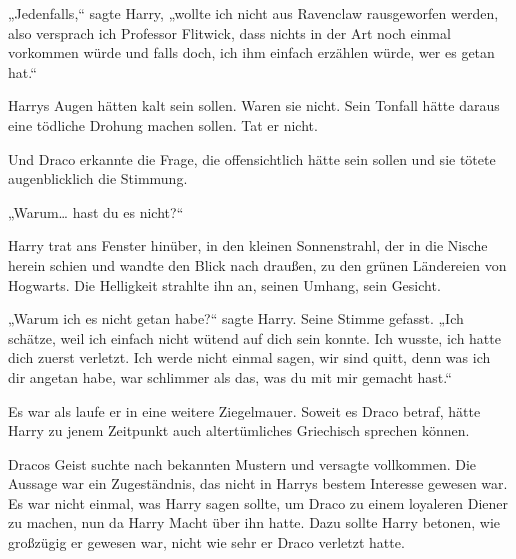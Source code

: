 „Jedenfalls,“ sagte Harry, „wollte ich nicht aus Ravenclaw rausgeworfen werden, also versprach ich Professor Flitwick, dass nichts in der Art noch einmal vorkommen würde und falls doch, ich ihm einfach erzählen würde, wer es getan hat.“

Harrys Augen hätten kalt sein sollen. Waren sie nicht. Sein Tonfall hätte daraus eine tödliche Drohung machen sollen. Tat er nicht.

Und Draco erkannte die Frage, die offensichtlich hätte sein sollen und sie tötete augenblicklich die Stimmung.

„Warum… hast du es nicht?“

Harry trat ans Fenster hinüber, in den kleinen Sonnenstrahl, der in die Nische herein schien und wandte den Blick nach draußen, zu den grünen Ländereien von Hogwarts. Die Helligkeit strahlte ihn an, seinen Umhang, sein Gesicht.

„Warum ich es nicht getan habe?“ sagte Harry. Seine Stimme gefasst. „Ich schätze, weil ich einfach nicht wütend auf dich sein konnte. Ich wusste, ich hatte dich zuerst verletzt. Ich werde nicht einmal sagen, wir sind quitt, denn was ich dir angetan habe, war schlimmer als das, was du mit mir gemacht hast.“

Es war als laufe er in eine weitere Ziegelmauer. Soweit es Draco betraf, hätte Harry zu jenem Zeitpunkt auch altertümliches Griechisch sprechen können.

Dracos Geist suchte nach bekannten Mustern und versagte vollkommen. Die Aussage war ein Zugeständnis, das nicht in Harrys bestem Interesse gewesen war. Es war nicht einmal, was Harry sagen sollte, um Draco zu einem loyaleren Diener zu machen, nun da Harry Macht über ihn hatte. Dazu sollte Harry betonen, wie großzügig er gewesen war, nicht wie sehr er Draco verletzt hatte.

